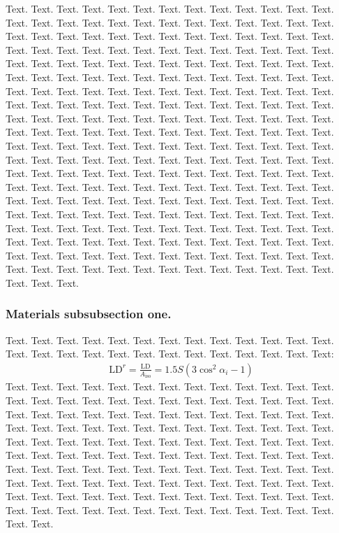\documentclass[a4,center,fleqn]{NAR}
\begin{document}
Text. Text. Text. Text. Text. Text. Text. Text. Text. Text. Text.
Text. Text. Text. Text. Text. Text. Text. Text. Text. Text. Text.
Text. Text. Text. Text. Text. Text. Text. Text. Text. Text. Text.
Text. Text. Text. Text. Text. Text. Text. Text. Text. Text. Text.
Text. Text. Text. Text. Text. Text. Text. Text. Text. Text. Text.
Text. Text. Text. Text. Text. Text. Text. Text. Text. Text. Text.
Text. Text. Text. Text. Text. Text. Text. Text. Text. Text. Text.
Text. Text. Text. Text. Text. Text. Text. Text. Text. Text. Text.
Text. Text. Text. Text. Text. Text. Text. Text. Text. Text. Text.
Text. Text. Text. Text. Text. Text. Text. Text. Text. Text. Text.
Text. Text. Text. Text. Text. Text. Text. Text. Text. Text. Text.
Text. Text. Text. Text. Text. Text. Text. Text. Text. Text. Text.
Text. Text. Text. Text. Text. Text. Text. Text. Text. Text. Text.
Text. Text. Text. Text. Text. Text. Text. Text. Text. Text. Text.
Text. Text. Text. Text. Text. Text. Text. Text. Text. Text. Text.
Text. Text. Text. Text. Text. Text. Text. Text. Text. Text. Text.
Text. Text. Text. Text. Text. Text. Text. Text. Text. Text. Text.
Text. Text. Text. Text. Text. Text. Text. Text. Text. Text. Text.
Text. Text. Text. Text. Text. Text. Text. Text. Text. Text. Text.
Text. Text. Text. Text. Text. Text. Text. Text. Text. Text. Text.
Text. Text. Text. Text. Text. Text. Text. Text. Text. Text. Text.
Text. Text. Text. Text. Text. Text. Text. Text. Text. Text. Text.
Text. Text. Text. Text. Text. Text. Text. Text. Text. Text. Text.
Text. Text. Text. Text. Text. Text. Text. Text. Text. Text.


\subsubsection{Materials subsubsection one.}

Text. Text. Text. Text. Text. Text. Text. Text. Text. Text. Text.
Text. Text. Text. Text. Text. Text. Text. Text. Text. Text. Text.
Text. Text. Text. Text:
\begin{align}
\mathrm{LD}^r = \frac{\mathrm{LD}}{A_\mathrm{iso}}
= 1.5 S \left( 3 \cos^2 \alpha_i - 1 \right)
\end{align}
Text. Text. Text. Text. Text. Text. Text. Text. Text. Text. Text.
Text. Text. Text. Text. Text. Text. Text. Text. Text. Text. Text.
Text. Text. Text. Text. Text. Text. Text. Text. Text. Text. Text.
Text. Text. Text. Text. Text. Text. Text. Text. Text. Text. Text.
Text. Text. Text. Text. Text. Text. Text. Text. Text. Text. Text.
Text. Text. Text. Text. Text. Text. Text. Text. Text. Text. Text.
Text. Text. Text. Text. Text. Text. Text. Text. Text. Text. Text.
Text. Text. Text. Text. Text. Text. Text. Text. Text. Text. Text.
Text. Text. Text. Text. Text. Text. Text. Text. Text. Text. Text.
Text. Text. Text. Text. Text. Text. Text. Text. Text. Text. Text.
Text. Text. Text. Text. Text. Text. Text. Text. Text. Text. Text.
Text. Text. Text. Text. Text. Text. Text. Text. Text. Text. Text.
\end{document}
